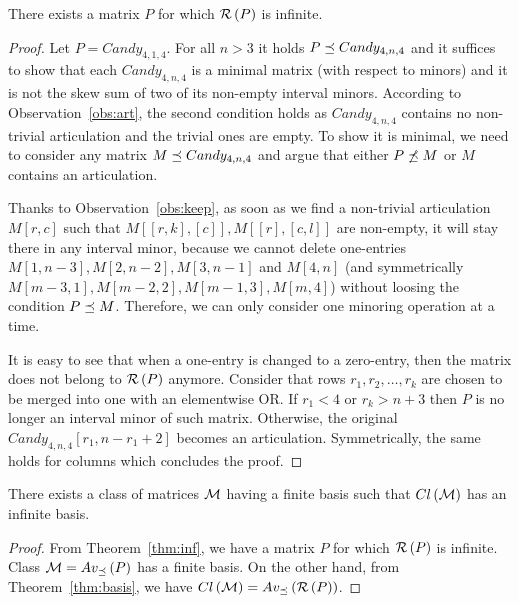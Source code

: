 \begin{thm}
\label{thm:inf}
There exists a matrix $P$ for which $\mathcal{R}\left(P\right)$ is infinite.
\end{thm}
\begin{proof}
Let $P=Candy_{4,1,4}$. For all $n>3$ it holds $P\preceq Candy_{4,n,4}$ and it suffices to show that each $Candy_{4,n,4}$ is a minimal matrix (with respect to minors) and it is not the skew sum of two of its non-empty interval minors. According to Observation~\ref{obs:art}, the second condition holds as $Candy_{4,n,4}$ contains no non-trivial articulation and the trivial ones are empty. To show it is minimal, we need to consider any matrix $M\preceq Candy_{4,n,4}$ and argue that either $P\not\preceq M$ or $M$ contains an articulation.

Thanks to Observation~\ref{obs:keep}, as soon as we find a non-trivial articulation $M[r,c]$ such that $M[[r,k],[c]],M[[r],[c,l]]$ are non-empty, it will stay there in any interval minor, because we cannot delete one-entries $M[1,n-3],M[2,n-2],M[3,n-1]$ and $M[4,n]$ (and symmetrically $M[m-3,1],M[m-2,2],M[m-1,3],M[m,4]$) without loosing the condition $P\preceq M$. Therefore, we can only consider one minoring operation at a time.

It is easy to see that when a one-entry is changed to a zero-entry, then the matrix does not belong to $\mathcal{R}\left(P\right)$ anymore. Consider that rows $r_1,r_2,\dots,r_k$ are chosen to be merged into one with an elementwise OR. If $r_1<4$ or $r_k>n+3$ then $P$ is no longer an interval minor of such matrix. Otherwise, the original $Candy_{4,n,4}[r_1,n-r_1+2]$ becomes an articulation. Symmetrically, the same holds for columns which concludes the proof.
\end{proof}

\begin{cor}
There exists a class of matrices $\mathcal{M}$ having a finite basis such that $Cl\left(\mathcal{M}\right)$ has an infinite basis.
\end{cor}
\begin{proof}
From Theorem~\ref{thm:inf}, we have a matrix $P$ for which $\mathcal{R}\left(P\right)$ is infinite. Class $\mathcal{M}=Av_{\preceq}\left(P\right)$ has a finite basis. On the other hand, from Theorem~\ref{thm:basis}, we have $Cl\left(\mathcal{M}\right)=Av_{\preceq}\left(\mathcal{R}\left(P\right)\right)$.
\end{proof}